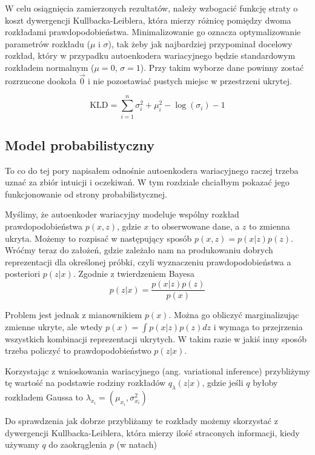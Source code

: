 W celu osiągnięcia zamierzonych rezultatów, należy wzbogacić funkcję straty o koszt dywergencji Kullbacka-Leiblera, która mierzy różnicę pomiędzy dwoma rozkładami prawdopodobieństwa. Minimalizowanie go oznacza optymalizowanie parametrów rozkładu ($\mu$ i $\sigma$), tak żeby jak najbardziej przypominał docelowy rozkład, który w przypadku autoenkodera wariacyjnego będzie standardowym rozkładem normalnym ($\mu = 0$,  $\sigma = 1$).
Przy takim wyborze dane powinny zostać rozrzucone dookoła $\vec{0}$ i nie pozostawiać pustych miejsc w przestrzeni ukrytej.

\begin{equation}
\mathrm { KLD } = \sum _ { i = 1 } ^ { n } \sigma _ { i } ^ { 2 } + \mu _ { i } ^ { 2 } - \log \left( \sigma _ { i } \right) - 1
\end{equation}


\subsection{Model probabilistyczny}

To co do tej pory napisałem odnośnie autoenkodera wariacyjnego raczej trzeba uznać za zbiór intuicji i oczekiwań. W tym rozdziale chciałbym pokazać jego funkcjonowanie od strony probabilistycznej.

Myślimy, że autoenkoder wariacyjny modeluje wspólny rozkład prawdopodobieństwa $p(x, z)$, gdzie $x$ to obserwowane dane, a $z$ to zmienna ukryta. Możemy to rozpisać w następujący sposób $p(x, z) = p(x|z)p(z)$. Wróćmy teraz do założeń, gdzie zależało nam na produkowaniu dobrych reprezentacji dla określonej próbki, czyli wyznaczeniu prawdopodobieństwa a posteriori $p(z|x)$. Zgodnie z twierdzeniem Bayesa
$$p(z|x)=\frac{p(x|z)p(z)}{p(x)}$$

Problem jest jednak z mianownikiem $p(x)$. Można go obliczyć marginalizując zmienne ukryte, ale wtedy $p(x)=\int{p(x|z)p(z)dz}$ i wymaga to przejrzenia wszystkich kombinacji reprezentacji ukrytych. W takim razie w jakiś inny sposób trzeba policzyć to prawdopodobieństwo $p(z|x)$.

Korzystając z wnioskowania wariacyjnego (ang. variational inference) przybliżymy tę wartość na podstawie rodziny rozkładów $q _ { \lambda } ( z | x )$, gdzie jeśli $q$ byłoby rozkładem Gaussa to $\lambda _ { x _ { i } } = \left( \mu _ { x _ { i } } , \sigma _ { x _ { i } } ^ { 2 } \right)$

Do sprawdzenia jak dobrze przybliżamy te rozkłady możemy skorzystać z dywergencji Kullbacka-Leiblera, która mierzy ilość straconych informacji, kiedy używamy $q$ do zaokrąglenia $p$ (w natach)

